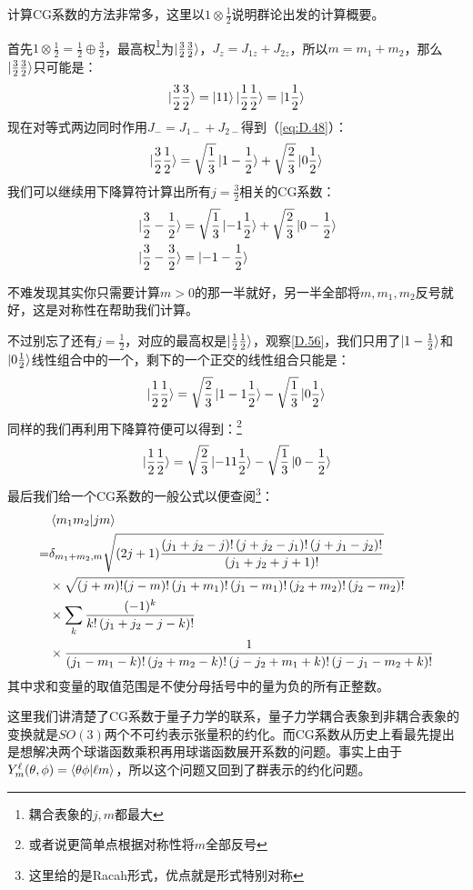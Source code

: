 计算CG系数的方法非常多，这里以$1\otimes \frac{1}{2}$说明群论出发的计算概要。

首先$1\otimes \frac{1}{2}=\frac{1}{2}\oplus\frac{3}{2}$，最高权\footnote{耦合表象的$j,m$都最大}为$\ket{\frac{3}{2}\frac{3}{2}}$，$J_z=J_{1z}+J_{2z}$，所以$m=m_1+m_2$，那么$\ket{\frac{3}{2}\frac{3}{2}}$只可能是：
\[\ket{\frac{3}{2}\frac{3}{2}}=\ket{11}\ket{\frac{1}{2}\frac{1}{2}}=\ket{1\frac{1}{2}}\]
现在对等式两边同时作用$J_{-}=J_{1-}+J_{2-}$得到（\ref{eq:D.48}）：
\begin{equation}
	\label{D.56}
	\ket{\frac{3}{2}\frac{1}{2}}=\sqrt{\frac{1}{3}}\ket{1-\frac{1}{2}}+\sqrt{\frac{2}{3}}\ket{0\frac{1}{2}}	
\end{equation}
我们可以继续用下降算符计算出所有$j=\frac{3}{2}$相关的CG系数：
\begin{align*}
	&\ket{\frac{3}{2}-\frac{1}{2}}=\sqrt{\frac{1}{3}}\ket{-1\frac{1}{2}}+\sqrt{\frac{2}{3}}\ket{0-\frac{1}{2}}\\
	&\ket{\frac{3}{2}-\frac{3}{2}}=\ket{-1-\frac{1}{2}}
\end{align*}

不难发现其实你只需要计算$m>0$的那一半就好，另一半全部将$m,m_1,m_2$反号就好，这是对称性在帮助我们计算。

不过别忘了还有$j=\frac{1}{2}$，对应的最高权是$\ket{\frac{1}{2}\frac{1}{2}}$，观察\ref{D.56}，我们只用了$\ket{1-\frac{1}{2}}$和$\ket{0\frac{1}{2}}$线性组合中的一个，剩下的一个正交的线性组合只能是：
\[\ket{\frac{1}{2}\frac{1}{2}}=\sqrt{\frac{2}{3}}\ket{1-1\frac{1}{2}}-\sqrt{\frac{1}{3}}\ket{0\frac{1}{2}}\]
同样的我们再利用下降算符便可以得到：\footnote{或者说更简单点根据对称性将$m$全部反号}
\[\ket{\frac{1}{2}\frac{1}{2}}=\sqrt{\frac{2}{3}}\ket{-11\frac{1}{2}}-\sqrt{\frac{1}{3}}\ket{0-\frac{1}{2}}\]
最后我们给一个CG系数的一般公式以便查阅\footnote{这里给的是Racah形式，优点就是形式特别对称}：
\begin{equation}
	\begin{aligned}
		& \braket{ m_{1} m_{2} | j m}\\
		= & \delta_{m_{1}+m_{2}, m} \sqrt{(2 j+1) \frac{\left(j_{1}+j_{2}-j\right) !\left(j+j_{2}-j_{1}\right) !\left(j+j_{1}-j_{2}\right) !}{\left(j_{1}+j_{2}+j+1\right) !}} \\
		& \times \sqrt{(j+m) !(j-m) !\left(j_{1}+m_{1}\right) !\left(j_{1}-m_{1}\right) !\left(j_{2}+m_{2}\right) !\left(j_{2}-m_{2}\right) !} \\
		& \times \sum_{k} \frac{(-1)^{k}}{k !\left(j_{1}+j_{2}-j-k\right) !} \\
		& \times \frac{1}{\left(j_{1}-m_{1}-k\right) !\left(j_{2}+m_{2}-k\right) !\left(j-j_{2}+m_{1}+k\right) !\left(j-j_{1}-m_{2}+k\right) !}
	\end{aligned}
\end{equation}
其中求和变量的取值范围是不使分母括号中的量为负的所有正整数。

这里我们讲清楚了CG系数于量子力学的联系，量子力学耦合表象到非耦合表象的变换就是$SO(3)$两个不可约表示张量积的约化。而CG系数从历史上看最先提出是想解决两个球谐函数乘积再用球谐函数展开系数的问题。事实上由于$Y^\ell_m(\theta,\phi)=\braket{\theta\phi|\ell m}$，所以这个问题又回到了群表示的约化问题。